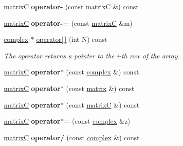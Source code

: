 \begin{DoxyCompactItemize}
\mbox{\hyperlink{classmatrix_c}{matrixC}} {\bfseries operator-\/} (const \mbox{\hyperlink{classmatrix_c}{matrixC}} \&) const
\item 
\mbox{\label{classmatrix_c_a03fd46edf995a822b88fbd99394e4e31}} 
\mbox{\hyperlink{classmatrix_c}{matrixC}} {\bfseries operator-\/=} (const \mbox{\hyperlink{classmatrix_c}{matrixC}} \&m)
\item 
\mbox{\label{classmatrix_c_a48d4698231c0a122f045e0bd816b4897}} 
\mbox{\hyperlink{classcomplex}{complex}} $\ast$ \mbox{\hyperlink{classmatrix_c_a48d4698231c0a122f045e0bd816b4897}{operator\mbox{[}$\,$\mbox{]}}} (int N) const
\begin{DoxyCompactList}\small\item\em The operator returns a pointer to the i-\/th row of the array. \end{DoxyCompactList}\item 
\mbox{\label{classmatrix_c_ac634dc38aa8b680be06bec32409cca2c}} 
\mbox{\hyperlink{classmatrix_c}{matrixC}} {\bfseries operator$\ast$} (const \mbox{\hyperlink{classcomplex}{complex}} \&) const
\item 
\mbox{\label{classmatrix_c_a2494dc4fde03bf506991f19f2fce6de8}} 
\mbox{\hyperlink{classmatrix_c}{matrixC}} {\bfseries operator$\ast$} (const \mbox{\hyperlink{classmatrix}{matrix}} \&) const
\item 
\mbox{\label{classmatrix_c_a522859445d59f2eff1865665ac57621c}} 
\mbox{\hyperlink{classmatrix_c}{matrixC}} {\bfseries operator$\ast$} (const \mbox{\hyperlink{classmatrix_c}{matrixC}} \&) const
\item 
\mbox{\label{classmatrix_c_aabc813e1e376d8918cec2cc8eb10b33f}} 
\mbox{\hyperlink{classmatrix_c}{matrixC}} {\bfseries operator$\ast$=} (const \mbox{\hyperlink{classcomplex}{complex}} \&z)
\item 
\mbox{\label{classmatrix_c_aba9937224522c2873ab26377b4ea8d71}} 
\mbox{\hyperlink{classmatrix_c}{matrixC}} {\bfseries operator/} (const \mbox{\hyperlink{classcomplex}{complex}} \&) const
\item 
\mbox{\label{classmatrix_c_ab8b0021504bde91ff5af3ba6a81e049e}} 

\end{DoxyCompactItemize}
